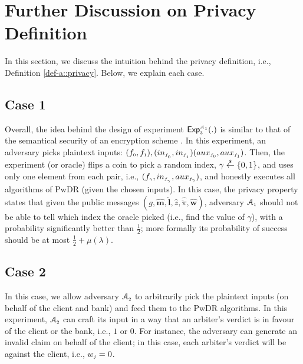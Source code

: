 

\section{Further Discussion on Privacy Definition}\label{sec:Further-Disc-Privacy-Def}


In this section, we discuss the intuition behind the privacy definition, i.e., Definition \ref{def-a::privacy}. Below, we explain each case.

%

\subsection{Case 1} Overall, the idea behind the design of  experiment $\mathsf{Exp}_{\scriptscriptstyle 3}^{\scriptscriptstyle\mathcal{A}_{\scriptscriptstyle 1}}(.)$ is similar to that of the semantical security of an encryption scheme \cite{DBLP:books/crc/KatzLindell2014}. In this experiment, an adversary picks plaintext inputs:  $(f_{\scriptscriptstyle 0}, f_{\scriptscriptstyle 1}),(in_{\scriptscriptstyle f_{\scriptscriptstyle_{\scriptscriptstyle 0}}},in_{\scriptscriptstyle f_{\scriptscriptstyle _1}}) ({aux}_{\scriptscriptstyle f_{0}},{aux}_{\scriptscriptstyle f_{\scriptscriptstyle1}})$. Then, the experiment (or oracle) flips a coin to pick a random index, $\gamma\stackrel{\scriptscriptstyle \$}\leftarrow\{0,1\}$, and uses only one element from each pair, i.e., $(f_{\scriptscriptstyle \gamma}, in_{\scriptscriptstyle f_{\scriptscriptstyle_{\scriptscriptstyle \gamma}}}, {aux}_{\scriptscriptstyle f_{\gamma}})$, and honestly executes all algorithms of PwDR (given the chosen inputs). In this case, the privacy property states that given the public messages $(g, \hat {\bm m}, \hat{\bm l}, \hat z, \hat{\ddot \pi}, \hat{\bm{w}})$,  adversary $\mathcal{A}_{\scriptscriptstyle 1}$ should not be able to tell which index the oracle picked (i.e., find the value of $\gamma$), with a probability significantly better than $\frac{1}{2}$; more formally its probability of success should be at most $\frac{1}{2}+\mu(\lambda)$.
%


\subsection{Case 2} 
In this case, we allow adversary $\mathcal{A}_{\scriptscriptstyle 2}$ to arbitrarily pick the plaintext inputs (on behalf of the client and bank) and feed them to the PwDR algorithms. In this experiment, $\mathcal{A}_{\scriptscriptstyle 2}$ can craft its input in a way that an arbiter's verdict is in favour of the client or the bank, i.e., $1$ or $0$. For instance, the adversary can generate an invalid claim on behalf of the client; in this case, each arbiter's verdict will be against the client, i.e., $w_{\scriptscriptstyle j}=0$. 

